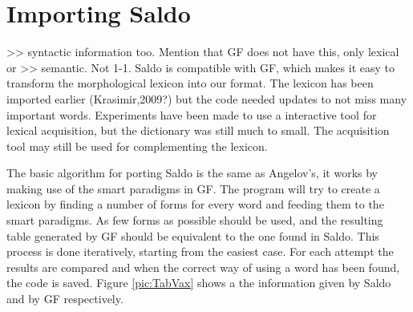 \documentclass{report}
\begin{document}
\section{Importing Saldo}
\label{sec:prog.saldo}
>> syntactic information too. Mention that GF does not have this, only lexical or
>> semantic. Not 1-1.
Saldo is compatible with GF, which makes it easy to transform the morphological
lexicon into our format. The lexicon has been imported earlier (Krasimir,2009?)
but the code needed updates to not miss many important words.
Experiments have been made to use a interactive tool for lexical acquisition,
but the dictionary was still much to small. The acquisition tool may still
be used for complementing the lexicon.

The basic algorithm for porting Saldo is the same as Angelov's, it works by
making use of the smart paradigms in GF.
The program will try to create a lexicon by finding a number of forms for every
word and feeding them to the smart paradigms. As few forms as possible should be
used, and the resulting table generated by GF should be equivalent to the one found
in Saldo. This process is done iteratively,
starting from the easiest case. For each attempt the results are compared and when
the correct way of using a word has been found, the code is saved.
Figure \ref{pic:TabVax} shows a the information given by Saldo and by GF respectively.\\
\end{document}
